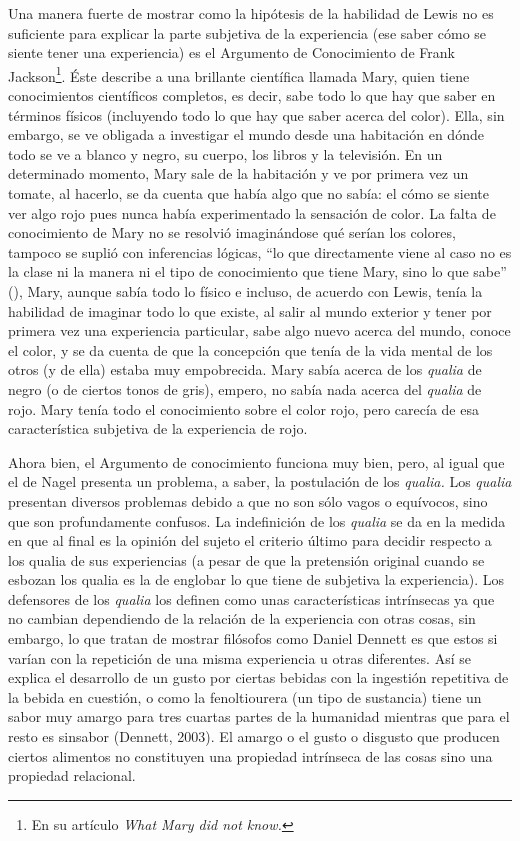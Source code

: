 \documentclass[]{book}
\begin{document}
\begin{refsection}
Una manera fuerte de mostrar como la hipótesis de la habilidad de Lewis
no es suficiente para explicar la parte subjetiva de la experiencia (ese
saber cómo se siente tener una experiencia) es el Argumento de
Conocimiento de Frank Jackson\footnote{En su artículo \emph{What Mary
  did not know.}}. Éste describe a una brillante científica llamada
Mary, quien tiene conocimientos científicos completos, es decir, sabe
todo lo que hay que saber en términos físicos (incluyendo todo lo que
hay que saber acerca del color). Ella, sin embargo, se ve obligada a
investigar el mundo desde una habitación en dónde todo se ve a blanco y
negro, su cuerpo, los libros y la televisión. En un determinado momento,
Mary sale de la habitación y ve por primera vez un tomate, al hacerlo,
se da cuenta que había algo que no sabía: el cómo se siente ver algo
rojo pues nunca había experimentado la sensación de color. La falta de
conocimiento de Mary no se resolvió imaginándose qué serían los colores,
tampoco se suplió con inferencias lógicas, ``lo que directamente viene
al caso no es la clase ni la manera ni el tipo de conocimiento que tiene
Mary, sino lo que sabe'' (\cite{Jackson2003}), Mary, aunque sabía todo lo físico e incluso,
de acuerdo con Lewis, tenía la habilidad de imaginar todo lo que existe,
al salir al mundo exterior y tener por primera vez una experiencia
particular, sabe algo nuevo acerca del mundo, conoce el color, y se da
cuenta de que la concepción que tenía de la vida mental de los otros (y
de ella) estaba muy empobrecida. Mary sabía acerca de los \emph{qualia}
de negro (o de ciertos tonos de gris), empero, no sabía nada acerca del
\emph{qualia} de rojo. Mary tenía todo el conocimiento sobre el color
rojo, pero carecía de esa característica subjetiva de la experiencia de
rojo.

Ahora bien, el Argumento de conocimiento funciona muy bien, pero, al
igual que el de Nagel presenta un problema, a saber, la postulación de
los \emph{qualia.} Los \emph{qualia} presentan diversos problemas debido
a que no son sólo vagos o equívocos, sino que son profundamente
confusos. La indefinición de los \emph{qualia} se da en la medida en que
al final es la opinión del sujeto el criterio último para decidir
respecto a los qualia de sus experiencias (a pesar de que la pretensión
original cuando se esbozan los qualia es la de englobar lo que tiene de
subjetiva la experiencia). Los defensores de los \emph{qualia} los
definen como unas características intrínsecas ya que no cambian
dependiendo de la relación de la experiencia con otras cosas, sin
embargo, lo que tratan de mostrar filósofos como Daniel Dennett es que
estos si varían con la repetición de una misma experiencia u otras
diferentes. Así se explica el desarrollo de un gusto por ciertas bebidas
con la ingestión repetitiva de la bebida en cuestión, o como la
fenoltiourera (un tipo de sustancia) tiene un sabor muy amargo para tres
cuartas partes de la humanidad mientras que para el resto es sinsabor
(Dennett, 2003). El amargo o el gusto o disgusto que producen ciertos
alimentos no constituyen una propiedad intrínseca de las cosas sino una
propiedad relacional.


\end{refsection}
\end{document}
